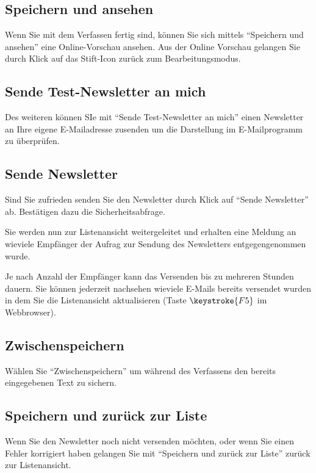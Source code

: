 \documentclass[article, a4paper, oneside, 11pt]{memoir}
\begin{document}
\subsection{Speichern und ansehen}

Wenn Sie mit dem Verfassen fertig sind, können Sie sich mittels "`Speichern und ansehen"' eine Online-Vorschau ansehen. Aus der Online Vorschau gelangen Sie durch Klick auf das Stift-Icon zurück zum Bearbeitungsmodus.

\subsection{Sende Test-Newsletter an mich}

Des weiteren können SIe mit "`Sende Test-Newsletter an mich"' einen Newsletter an Ihre eigene E-Mailadresse zusenden um die Darstellung im E-Mailprogramm zu überprüfen.

\subsection{Sende Newsletter}

Sind Sie zufrieden senden Sie den Newsletter durch Klick auf "`Sende Newsletter"' ab. Bestätigen dazu die Sicherheitsabfrage.

Sie werden nun zur Listenansicht weitergeleitet und erhalten eine Meldung an wieviele Empfänger der Aufrag zur Sendung des Newsletters entgegengenommen wurde.

Je nach Anzahl der Empfänger kann das Versenden bis zu mehreren Stunden dauern. Sie können jederzeit nachsehen wieviele E-Mails bereits versendet wurden in dem Sie die Listenansicht aktualisieren (Taste $\keystroke{F5}$ im Webbrowser).


\subsection{Zwischenspeichern}

Wählen Sie "`Zwischenspeichern"' um während des Verfassens den bereits eingegebenen Text zu sichern.

\subsection{Speichern und zurück zur Liste}

Wenn Sie den Newsletter noch nicht versenden möchten, oder wenn Sie einen Fehler korrigiert haben gelangen Sie mit "`Speichern und zurück zur Liste"' zurück zur Listenansicht.
\end{document}
